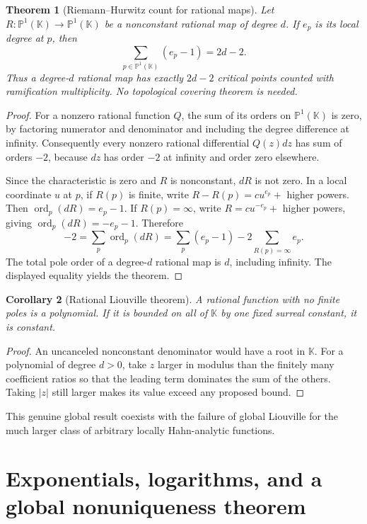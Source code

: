 \documentclass[11pt,a4paper]{article}
\numberwithin{equation}{section}
\newtheorem{theorem}{Theorem}[section]
\newtheorem{corollary}[theorem]{Corollary}
\theoremstyle{definition}
\theoremstyle{remark}
\newcommand{\K}{\mathbb K}
\newcommand{\ord}{\operatorname{ord}}
\begin{document}
\begin{theorem}[Riemann--Hurwitz count for rational maps]
\label{thm:RH}
Let $R:\mathbb P^1(\K)\to\mathbb P^1(\K)$ be a nonconstant rational map of degree $d$. If $e_p$ is its local degree at $p$, then
\[
 \sum_{p\in\mathbb P^1(\K)}(e_p-1)=2d-2.
\]
Thus a degree-$d$ rational map has exactly $2d-2$ critical points counted with ramification multiplicity. No topological covering theorem is needed.
\end{theorem}
\begin{proof}
For a nonzero rational function $Q$, the sum of its orders on $\mathbb P^1(\K)$ is zero, by factoring numerator and denominator and including the degree difference at infinity. Consequently every nonzero rational differential $Q(z)dz$ has sum of orders $-2$, because $dz$ has order $-2$ at infinity and order zero elsewhere.

Since the characteristic is zero and $R$ is nonconstant, $dR$ is not zero. In a local coordinate $u$ at $p$, if $R(p)$ is finite, write
$R-R(p)=cu^{e_p}+$ higher powers. Then $\ord_p(dR)=e_p-1$. If $R(p)=\infty$, write $R=cu^{-e_p}+$ higher powers, giving $\ord_p(dR)=-e_p-1$. Therefore
\[
 -2=\sum_p\ord_p(dR)
 =\sum_p(e_p-1)-2\sum_{R(p)=\infty}e_p.
\]
The total pole order of a degree-$d$ rational map is $d$, including infinity. The displayed equality yields the theorem.
\end{proof}

\begin{corollary}[Rational Liouville theorem]
A rational function with no finite poles is a polynomial. If it is bounded on all of $\K$ by one fixed surreal constant, it is constant.
\end{corollary}
\begin{proof}
An uncanceled nonconstant denominator would have a root in $\K$. For a polynomial of degree $d>0$, take $z$ larger in modulus than the finitely many coefficient ratios so that the leading term dominates the sum of the others. Taking $|z|$ still larger makes its value exceed any proposed bound.
\end{proof}
This genuine global result coexists with the failure of global Liouville for the much larger class of arbitrary locally Hahn-analytic functions.

\section{Exponentials, logarithms, and a global nonuniqueness theorem}
\label{sec:explog}
\end{document}
